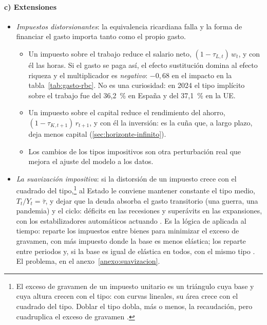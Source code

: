 \documentclass[11pt]{article}
\begin{document}
\paragraph{c) Extensiones}

\begin{itemize}
\item \emph{Impuestos distorsionantes}: la equivalencia ricardiana falla y la forma de financiar el gasto importa tanto como el propio gasto\nocite{BaxterKing1993Fiscal}.
  \begin{itemize}
  \item Un impuesto sobre el trabajo reduce el salario neto, $(1-\tau_{L,t})\,w_t$, y con él las horas. Si el gasto se paga así, el efecto sustitución domina al efecto riqueza y el multiplicador es \emph{negativo}: $-0{,}68$ en el impacto en la tabla~\ref{tab:gasto-rbc}. No es una curiosidad: en 2024 el tipo implícito sobre el trabajo fue del 36,2~\% en España y del 37,1~\% en la UE\nocite{CE2026DataTaxation}.
  \item Un impuesto sobre el capital reduce el rendimiento del ahorro, $(1-\tau_{K,t+1})\,r_{t+1}$, y con él la inversión: es la cuña que, a largo plazo, deja menos capital (\ref{sec:horizonte-infinito}).
  \item Los cambios de los tipos impositivos son otra perturbación real que mejora el ajuste del modelo a los datos\nocite{McGrattan1994Macroeconomic}.
  \end{itemize}
\item \emph{La suavización impositiva}: si la distorsión de un impuesto crece con el cuadrado del tipo,\footnote{El exceso de gravamen de un impuesto unitario es un triángulo cuya base y cuya altura crecen con el tipo: con curvas lineales, su área crece con el cuadrado del tipo. Doblar el tipo dobla, más o menos, la recaudación, pero cuadruplica el exceso de gravamen .} al Estado le conviene mantener constante el tipo medio, $T_t/Y_t=\bar\tau$, y dejar que la deuda absorba el gasto transitorio (una guerra, una pandemia) y el ciclo: déficits en las recesiones y superávits en las expansiones, con los estabilizadores automáticos actuando\nocite{Barro1979Determination} . Es la lógica de  aplicada al tiempo:  reparte los impuestos entre bienes para minimizar el exceso de gravamen, con más impuesto donde la base es menos elástica;  los reparte entre periodos y, si la base es igual de elástica en todos, con el mismo tipo . El problema, en el anexo~\ref{anexo:suavizacion}.

\end{itemize}
\end{document}
